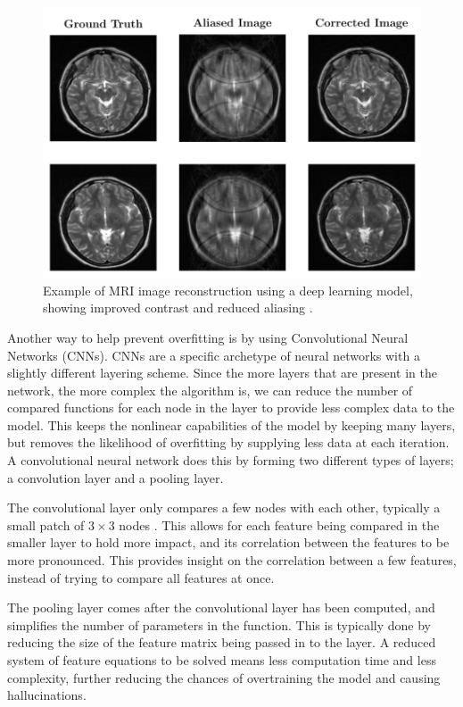 \documentclass[14pt]{extreport}
\begin{document}
        \begin{figure}[h]
            \begin{center}
                \includegraphics[width = 0.6\linewidth]{Brain Images Corrected.png}
                \caption{Example of MRI image reconstruction using a deep learning model, showing improved contrast and reduced aliasing \cite{Hyun_Kim_Lee_Lee_Seo_2018}.}
            \end{center}
        \end{figure}

        Another way to help prevent overfitting is by using Convolutional Neural Networks (CNNs). CNNs are a specific archetype of neural networks with a slightly different layering scheme. Since the more layers that are present in the network, the more complex the algorithm is, we can reduce the number of compared functions for each node in the layer to provide less complex data to the model. This keeps the nonlinear capabilities of the model by keeping many layers, but removes the likelihood of overfitting by supplying less data at each iteration. A convolutional neural network does this by forming two different types of layers; a convolution layer and a pooling layer. 

        The convolutional layer only compares a few nodes with each other, typically a small patch of $3\times3$ nodes \cite{Liu_Pan_Li_Chen_Tang_Lu_Wang_2018}. This allows for each feature being compared in the smaller layer to hold more impact, and its correlation between the features to be more pronounced. This provides insight on the correlation between a few features, instead of trying to compare all features at once.

        The pooling layer comes after the convolutional layer has been computed, and simplifies the number of parameters in the function. This is typically done by reducing the size of the feature matrix being passed in to the layer. A reduced system of feature equations to be solved means less computation time and less complexity, further reducing the chances of overtraining the model and causing hallucinations.
\end{document}
